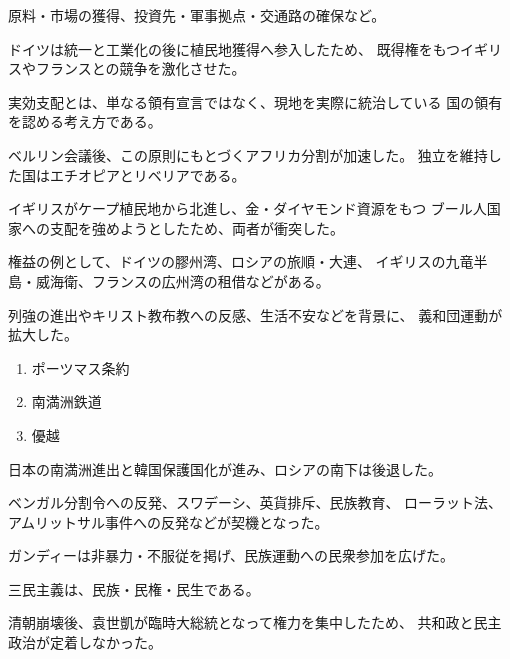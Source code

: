 \documentclass[a4paper,11pt]{ltjsarticle}
\begin{document}
\begin{description}[
  style=nextline,
  leftmargin=0pt,
  labelindent=0pt
]

\item[第1問]

原料・市場の獲得、投資先・軍事拠点・交通路の確保など。

ドイツは統一と工業化の後に植民地獲得へ参入したため、
既得権をもつイギリスやフランスとの競争を激化させた。

\item[第2問]

実効支配とは、単なる領有宣言ではなく、現地を実際に統治している
国の領有を認める考え方である。

ベルリン会議後、この原則にもとづくアフリカ分割が加速した。
独立を維持した国はエチオピアとリベリアである。

\item[第3問]

イギリスがケープ植民地から北進し、金・ダイヤモンド資源をもつ
ブール人国家への支配を強めようとしたため、両者が衝突した。

\item[第4問]

権益の例として、ドイツの膠州湾、ロシアの旅順・大連、
イギリスの九竜半島・威海衛、フランスの広州湾の租借などがある。

列強の進出やキリスト教布教への反感、生活不安などを背景に、
義和団運動が拡大した。

\item[第5問]

\begin{enumerate}[label=\textcircled{\arabic*}]
  \item ポーツマス条約
  \item 南満洲鉄道
  \item 優越
\end{enumerate}

日本の南満洲進出と韓国保護国化が進み、ロシアの南下は後退した。

\item[第6問]

ベンガル分割令への反発、スワデーシ、英貨排斥、民族教育、
ローラット法、アムリットサル事件への反発などが契機となった。

ガンディーは非暴力・不服従を掲げ、民族運動への民衆参加を広げた。

\item[第7問]

三民主義は、民族・民権・民生である。

清朝崩壊後、袁世凱が臨時大総統となって権力を集中したため、
共和政と民主政治が定着しなかった。


\end{description}
\end{document}
